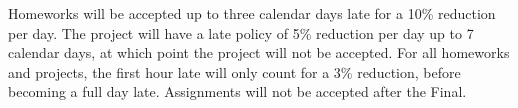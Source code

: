 Homeworks will be accepted up to three calendar days late for a 10\% reduction per day. The project will have a late policy of 5\% reduction per day up to 7 calendar days, at which point the project will not be accepted. For all homeworks and projects, the first hour late will only count for a 3\% reduction, before becoming a full day late. Assignments will not be accepted after the Final.